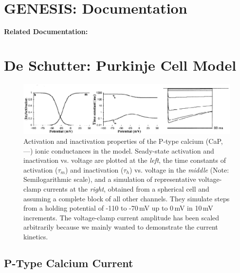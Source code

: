 \documentclass[12pt]{article}
\begin{document}
\section*{GENESIS: Documentation}

{\bf Related Documentation:}

\section*{De Schutter: Purkinje Cell Model}

\begin{figure}[h]
\centering
   \includegraphics[scale=0.75]{figures/DS1.2C.eps}
   \caption{Activation and inactivation properties of the P-type calcium (CaP, ---) ionic conductances in the model. Seady-state activation and inactivation vs. voltage are plotted at the {\em left}, the time constants of activation ($\tau_m$) and inactivation ($\tau_h$) vs. voltage in the {\em middle} (Note: Semilogarithmic scale), and a simulation of representative voltage-clamp currents at the {\em right}, obtained from a spherical cell and assuming a complete block of all other channels. They simulate steps from a holding potential of -110 to -70\,mV up to 0\,mV in 10\,mV increments. The voltage-clamp current amplitude has been scaled arbitrarily because we mainly wanted to demonstrate the current kinetics.}
   \label{fig:DS1.2C}
\end{figure}

\subsection*{P-Type Calcium Current}
\end{document}
